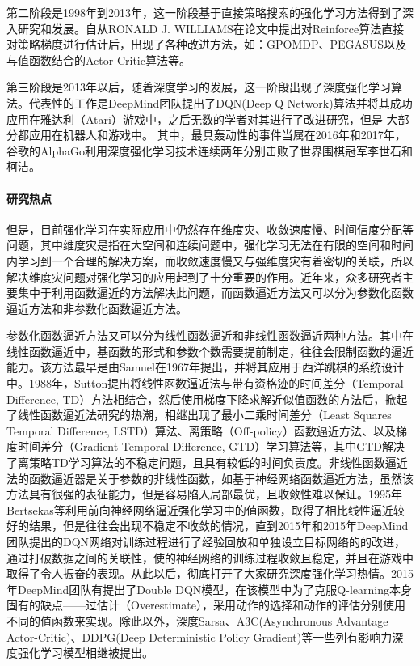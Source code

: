 第二阶段是1998年到2013年，这一阶段基于直接策略搜索的强化学习方法得到了深入研究和发展。自从RONALD J. WILLIAMS在论文\citep{williams1992simple}中提出对Reinforce算法直接对策略梯度进行估计后，出现了各种改进方法，如：GPOMDP\citep{baxter2001infinite}、PEGASUS\citep{neumann2005reinforcement}以及与值函数结合的Actor-Critic算法\citep{konda2000actor}等。

第三阶段是2013年以后，随着深度学习的发展，这一阶段出现了深度强化学习算法。代表性的工作是DeepMind团队提出了DQN(Deep Q Network)算法并将其成功应用在雅达利（Atari）游戏中\citep{mnih2013playing}，之后无数的学者对其进行了改进研究，但是
大部分都应用在机器人和游戏中。
其中，最具轰动性的事件当属在2016年和2017年，谷歌的AlphaGo利用深度强化学习技术连续两年分别击败了世界围棋冠军李世石和柯洁。

\paragraph{研究热点}
但是，目前强化学习在实际应用中仍然存在维度灾、收敛速度慢、时间信度分配等问题，其中维度灾是指在大空间和连续问题中，强化学习无法在有限的空间和时间内学习到一个合理的解决方案，而收敛速度慢又与强维度灾有着密切的关联，所以解决维度灾问题对强化学习的应用起到了十分重要的作用。近年来，众多研究者主要集中于利用函数逼近的方法解决此问题，而函数逼近方法又可以分为参数化函数逼近方法和非参数化函数逼近方法。

参数化函数逼近方法又可以分为线性函数逼近和非线性函数逼近两种方法。其中在线性函数逼近中，基函数的形式和参数个数需要提前制定，往往会限制函数的逼近能力。该方法最早是由Samuel在1967年提出，并将其应用于西洋跳棋的系统设计中\citep{samuel1959some}。1988年，Sutton提出将线性函数逼近法与带有资格迹的时间差分（Temporal Difference, TD）方法相结合，然后使用梯度下降求解近似值函数的方法\citep{sutton1988learning}后，掀起了线性函数逼近法研究的热潮，相继出现了最小二乘时间差分（Least Squares Temporal Difference, LSTD）算法\citep{bradtke1996linear}、离策略（Off-policy）函数逼近方法\citep{precup2001off}、以及梯度时间差分（Gradient Temporal Difference, GTD）学习算法\citep{sutton2009convergent}等，其中GTD解决了离策略TD学习算法的不稳定问题，且具有较低的时间负责度\citep{sutton2009convergent}。非线性函数逼近法的函数逼近器是关于参数的非线性函数，如基于神经网络函数逼近方法，虽然该方法具有很强的表征能力，但是容易陷入局部最优，且收敛性难以保证。1995年Bertsekas等利用前向神经网络逼近强化学习中的值函数，取得了相比线性逼近较好的结果，但是往往会出现不稳定不收敛的情况\citep{bertsekas1995neuro}，直到2015年和2015年DeepMind团队提出的DQN网络对训练过程进行了经验回放\citep{mnih2013playing}和单独设立目标网络\citep{mnih2015human}的的改进，通过打破数据之间的关联性，使的神经网络的训练过程收敛且稳定，并且在游戏中取得了令人振奋的表现。从此以后，彻底打开了大家研究深度强化学习热情。2015年DeepMind团队有提出了Double DQN模型，在该模型中为了克服Q-learning本身固有的缺点——过估计（Overestimate），采用动作的选择和动作的评估分别使用不同的值函数来实现。除此以外，深度Sarsa、A3C(Asynchronous Advantage Actor-Critic)、DDPG(Deep Deterministic Policy Gradient)等一些列有影响力深度强化学习模型相继被提出。

